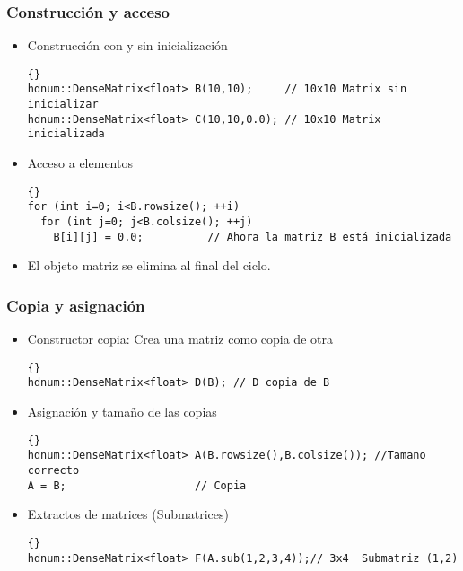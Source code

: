 \documentclass[a4paper,11pt]{article}
\theoremstyle{definition}
\begin{document}
\begin{frame}[fragile]
\frametitle{Construcción y acceso}
\begin{itemize}
\item Construcción con y sin inicialización \\
{\footnotesize{\begin{lstlisting}{}
hdnum::DenseMatrix<float> B(10,10);     // 10x10 Matrix sin inicializar
hdnum::DenseMatrix<float> C(10,10,0.0); // 10x10 Matrix inicializada
\end{lstlisting}}}
\item Acceso a elementos\\
{\footnotesize{\begin{lstlisting}{}
for (int i=0; i<B.rowsize(); ++i)
  for (int j=0; j<B.colsize(); ++j)
    B[i][j] = 0.0;          // Ahora la matriz B está inicializada
\end{lstlisting}}}
\item El objeto matriz se elimina al final del ciclo.
\end{itemize}
\end{frame}

\begin{frame}[fragile]
\frametitle{Copia y asignación}
\begin{itemize}
\item Constructor copia: Crea una matriz como copia de otra
{\footnotesize{\begin{lstlisting}{}
hdnum::DenseMatrix<float> D(B); // D copia de B
\end{lstlisting}}}
\item Asignación y tamaño de las copias
{\footnotesize{\begin{lstlisting}{}
hdnum::DenseMatrix<float> A(B.rowsize(),B.colsize()); //Tamano correcto
A = B;                    // Copia
\end{lstlisting}}}
\item Extractos de matrices (Submatrices)\\
{\footnotesize{\begin{lstlisting}{}
hdnum::DenseMatrix<float> F(A.sub(1,2,3,4));// 3x4  Submatriz (1,2)
\end{lstlisting}}}
\end{itemize}
\end{frame}
\end{document}
